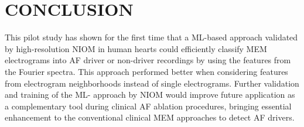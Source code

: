 \documentclass{article}
\begin{document}


\section{CONCLUSION}

This pilot study has shown for the first time that a ML-based approach validated by high-resolution NIOM in human hearts could efficiently classify MEM electrograms into AF driver or non-driver recordings by using the features from the Fourier spectra. This approach performed better when considering features from electrogram neighborhoods instead of single electrograms. Further validation and training of the ML- approach by NIOM would improve future application as a complementary tool during clinical AF ablation procedures, bringing essential enhancement to the conventional clinical MEM approaches to detect AF drivers. 

\nocite{langley00}





\newpage
\clearpage
\appendix
\end{document}

